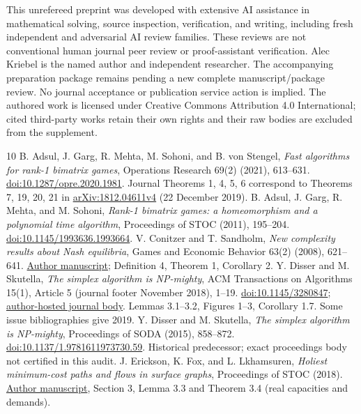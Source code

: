 \documentclass[11pt]{article}
\theoremstyle{remark}\newtheorem{remark}[theorem]{Remark}
\begin{document}
This unrefereed preprint was developed with extensive AI assistance in mathematical solving, source inspection, verification, and writing, including fresh independent and adversarial AI review families. These reviews are not conventional human journal peer review or proof-assistant verification. Alec Kriebel is the named author and independent researcher. The accompanying preparation package remains pending a new complete manuscript/package review. No journal acceptance or publication service action is implied. The authored work is licensed under Creative Commons Attribution 4.0 International; cited third-party works retain their own rights and their raw bodies are excluded from the supplement.

\begin{thebibliography}{10}\small
{} B. Adsul, J. Garg, R. Mehta, M. Sohoni, and B. von Stengel, \emph{Fast algorithms for rank-1 bimatrix games}, Operations Research 69(2) (2021), 613--631. \href{https://doi.org/10.1287/opre.2020.1981}{doi:10.1287/opre.2020.1981}. Journal Theorems 1, 4, 5, 6 correspond to Theorems 7, 19, 20, 21 in \href{https://arxiv.org/abs/1812.04611}{arXiv:1812.04611v4} (22 December 2019).
 B. Adsul, J. Garg, R. Mehta, and M. Sohoni, \emph{Rank-1 bimatrix games: a homeomorphism and a polynomial time algorithm}, Proceedings of STOC (2011), 195--204. \href{https://doi.org/10.1145/1993636.1993664}{doi:10.1145/1993636.1993664}.
 V. Conitzer and T. Sandholm, \emph{New complexity results about Nash equilibria}, Games and Economic Behavior 63(2) (2008), 621--641. \href{https://www.cs.cmu.edu/~conitzer/nashGEB08.pdf}{Author manuscript}; Definition 4, Theorem 1, Corollary 2.
 Y. Disser and M. Skutella, \emph{The simplex algorithm is NP-mighty}, ACM Transactions on Algorithms 15(1), Article 5 (journal footer November 2018), 1--19. \href{https://doi.org/10.1145/3280847}{doi:10.1145/3280847}; \href{https://www2.mathematik.tu-darmstadt.de/~disser/pdfs/DisserSkutella18.pdf}{author-hosted journal body}. Lemmas 3.1--3.2, Figures 1--3, Corollary 1.7. Some issue bibliographies give 2019.
 Y. Disser and M. Skutella, \emph{The simplex algorithm is NP-mighty}, Proceedings of SODA (2015), 858--872. \href{https://doi.org/10.1137/1.9781611973730.59}{doi:10.1137/1.9781611973730.59}. Historical predecessor; exact proceedings body not certified in this audit.
 J. Erickson, K. Fox, and L. Lkhamsuren, \emph{Holiest minimum-cost paths and flows in surface graphs}, Proceedings of STOC (2018). \href{https://jeffe.cs.illinois.edu/pubs/pdf/holiestx.pdf}{Author manuscript}, Section 3, Lemma 3.3 and Theorem 3.4 (real capacities and demands).

\end{thebibliography}
\end{document}
